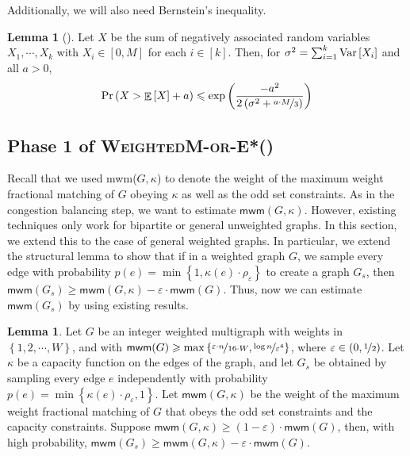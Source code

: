 \documentclass[a4paper,11pt]{article}
\DeclareMathOperator*{\Exp}{\ensuremath{{\mathbb{E}}}}
\DeclareMathOperator*{\Prob}{\ensuremath{\textnormal{Pr}}}
\renewcommand{\Pr}{\Prob}
\newcommand{\prob}[1]{\Pr\paren{#1}}
\newcommand{\paren}[1]{\left ( #1 \right )}
\newcommand{\bracket}[1]{\left [ #1 \right ]}
\newcommand{\expect}[1]{\Exp\bracket{#1}}
\newcommand{\var}[1]{\textnormal{Var}\bracket{#1}}
\newcommand{\set}[1]{\ensuremath{\left\{ #1 \right\}}}
\newcommand{\eps}{\varepsilon}
\theoremstyle{definition}
\theoremstyle{definition}
\theoremstyle{definition}
\theoremstyle{definition}
\theoremstyle{definition}
\newtheorem{lemma2}[definition2]{Lemma}
\theoremstyle{definition}
\theoremstyle{definition}
\theoremstyle{definition}
\theoremstyle{definition}
\theoremstyle{definition}
\theoremstyle{definition}
\theoremstyle{definition}
\theoremstyle{definition}
\theoremstyle{definition}
\theoremstyle{definition}
\begin{document}
Additionally, we will also need Bernstein's inequality.

\begin{lemma2}[\cite{MMR94}]\label{lem:concentrate}
	Let $X$ be the sum of negatively associated random variables $X_1,\cdots, X_k$ with $X_i\in [0,M]$ for each $i\in [k]$. Then, for $\sigma^2=\sum_{i=1}^k \var{X_i}$ and all $a>0$, 
	\begin{align*}
	\prob{X>\expect{X}+a}\leqslant \exp\paren{\frac{-a^2}{2\paren{\sigma^2+\nicefrac{a\cdot M}{3}}}}
\end{align*}
\end{lemma2}

\subsection{Phase 1 of \textsc{WeightedM-or-E*}()}

Recall that we used \textsf{mwm}($G,\kappa$) to denote the weight of the maximum weight fractional matching of $G$ obeying $\kappa$ as well as the odd set constraints. As in the congestion balancing step, we want to estimate $\textsf{mwm}(G,\kappa)$. However, existing techniques only work for bipartite or general unweighted graphs. In this section, we extend this to the case of general weighted graphs. In particular, we extend the structural lemma to show that if in a weighted graph $G$, we sample every edge with probability $p(e)=\min\set{1,\kappa(e)\cdot \rho_{\eps}}$ to create a graph $G_s$, then $\textsf{mwm}(G_s)\geqslant \textsf{mwm}(G,\kappa)-\eps\cdot \textsf{mwm}(G)$. Thus, now we can estimate $\textsf{mwm}(G_s)$ by using existing results. 

\begin{lemma2}\label{lem:phase1}
Let $G$ be an integer weighted multigraph with weights in $\set{1,2,\cdots, W}$,  and with $\textsf{mwm}(G)\geqslant \max\set{\nicefrac{\eps\cdot n}{16\cdot W},\nicefrac{\log n}{\eps^4}}$, where $\eps\in (0,\nicefrac{1}{2})$. Let $\kappa$ be a capacity function on the edges of the graph, and let $G_s$ be obtained by sampling every edge $e$ independently with probability $p(e)=\min\set{\kappa(e)\cdot \rho_{\eps},1}$. Let $\textsf{mwm}(G,\kappa)$ be the weight of the maximum weight fractional matching of $G$ that obeys the odd set constraints and the capacity constraints. Suppose $\textsf{mwm}(G,\kappa)\geqslant (1-\eps)\cdot \textsf{mwm}(G)$, then, with high probability, $\textsf{mwm}(G_s)\geqslant \textsf{mwm}(G,\kappa)-\eps\cdot \textsf{mwm}(G)$.
\end{lemma2}
\end{document}
